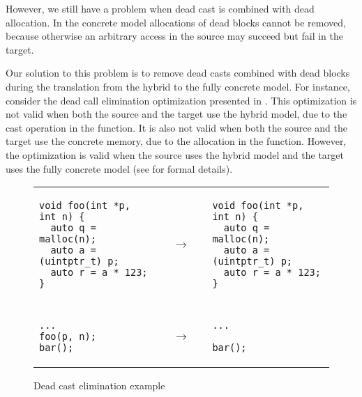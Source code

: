 However, we still have a problem when dead cast is combined with dead
allocation. In the concrete model allocations of dead blocks cannot be
removed, because otherwise an arbitrary access in the source may
succeed but fail in the target. 

Our solution to this problem is to remove dead casts combined with dead blocks during the
translation from the hybrid to the fully concrete model.  For instance, consider the dead call
elimination optimization presented in . This
optimization is not valid when both the source and the target use the hybrid model, due to the cast
operation in the function. It is also not valid when both the source and the target use the concrete
memory, due to the allocation in the function. However, the optimization is valid when the source
uses the hybrid model and the target uses the fully concrete model (see
 for formal details).

\begin{figure}[t]
\small \center
\begin{tabular}{@{}l@{}l@{~~}l}
\begin{minipage}{0.4\textwidth}
\begin{verbatim}
void foo(int *p, int n) {
  auto q = malloc(n);
  auto a = (uintptr_t) p;
  auto r = a * 123;
}
\end{verbatim}
\end{minipage}
&
$\quad\rightarrow\quad$
&
\begin{minipage}{0.4\textwidth}
\begin{verbatim}
void foo(int *p, int n) {
  auto q = malloc(n);
  auto a = (uintptr_t) p;
  auto r = a * 123;
}
\end{verbatim}
\end{minipage}
\\
\\
\begin{minipage}{0.4\textwidth}
\begin{verbatim}
...
foo(p, n);
bar();
\end{verbatim}
\end{minipage}
&
$\quad\rightarrow\quad$
&
\begin{minipage}{0.4\textwidth}
\begin{verbatim}
...

bar();
\end{verbatim}
\end{minipage}
\end{tabular}
\caption{Dead cast elimination example}
\label{fig:intptrcast:formal-semantics:deadcast}
\end{figure}


